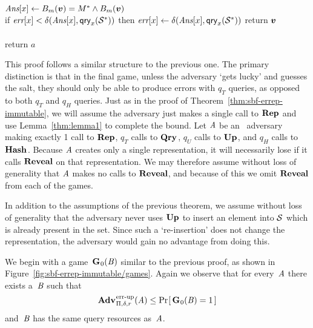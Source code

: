 \begin{figure*}
{{    \tab $\textit{Ans}[x] \gets {B}_m(\boldsymbol{v}) = M^* \wedge {B}_m(\boldsymbol{v})$\\
    \tab if $\textit{err}[x] < \delta(\textit{Ans}[x],\mathsf{qry}_x(\mathcal{S}^*))$ then
    \tab\tab $\textit{err}[x] \gets \delta(\textit{Ans}[x],\mathsf{qry}_x(\mathcal{S}^*))$
    }
    return $\boldsymbol{v}$
}
{
  \vspace{-7pt}
  \
      \hfill {} \\[2pt]
    \\[2pt]
    return $a$
}
\caption{Games 0, 1, and 2 for proof of Theorem~\ref{thm:sbf-erreps}.}
\label{fig:sbf-errep-immutable/games}
\end{figure*}

This proof follows a similar structure to the previous one. The primary distinction is that in the final game, unless the adversary `gets lucky' and guesses the salt, they should only be able to produce errors with $q_T$ queries, as opposed to both $q_T$ and $q_H$ queries.
%
Just as in the proof of Theorem~\ref{thm:sbf-errep-immutable}, we will assume the adversary just makes a single call to $\textup{\textbf{Rep}}\hspace{0.5pt}$ and use Lemma~\ref{thm:lemma1} to complete the bound. Let $\mathit{A}$ be an \erreps\ adversary making exactly 1 call to $\textup{\textbf{Rep}}\hspace{0.5pt}$, $q_T$ calls to $\textup{\textbf{Qry}}\hspace{0.5pt}$, $q_U$ calls to $\textup{\textbf{Up}}\hspace{0.5pt}$, and $q_H$ calls to $\textup{\textbf{Hash}}\hspace{0.5pt}$. Because $\mathit{A}$ creates only a single representation, it will necessarily lose if it calls $\mathbf{Reveal}$ on that representation. We may therefore assume without loss of generality that $\mathit{A}$ makes no calls to $\mathbf{Reveal}$, and because of this we omit $\mathbf{Reveal}$ from each of the games.

In addition to the assumptions of the previous theorem, we assume without loss of generality that the adversary never uses $\textup{\textbf{Up}}\hspace{0.5pt}$ to insert an element into $\mathcal{S}$ which is already present in the set. Since such a `re-insertion' does not change the representation, the adversary would gain no advantage from doing this.

We begin with a game~$\textup{\textbf{G}}\hspace{0.5pt}_0(\mathit{B})$ similar to the previous proof, as shown in Figure~\ref{fig:sbf-errep-immutable/games}. Again we observe that for every~$\mathit{A}$ there exists a~$\mathit{B}$  such that
\begin{equation}
  \Adv{\errep}_{\Pi,\delta,r}(\advA) \leq \Prob{\game_0(\advB) = 1}
\end{equation}
and~$\mathit{B}$ has the same query resources as~$\mathit{A}$.

